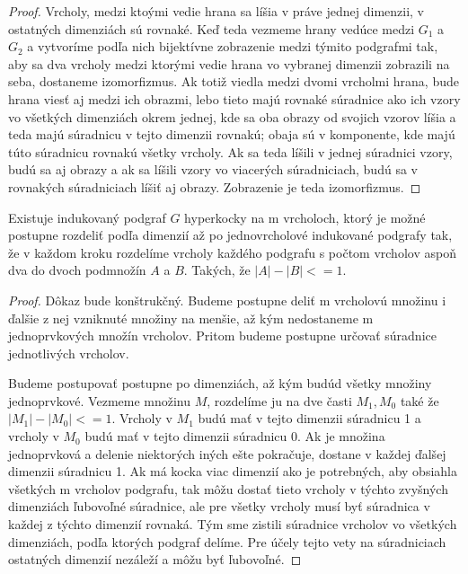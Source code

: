 \begin{proof}
Vrcholy, medzi ktoými vedie hrana sa líšia v práve jednej dimenzii, v
ostatných dimenziách sú rovnaké. Keď teda vezmeme hrany vedúce medzi 
$G_{1}$ a $G_{2}$ a vytvoríme podľa nich bijektívne zobrazenie medzi týmito
podgrafmi tak, aby sa dva vrcholy medzi ktorými vedie hrana vo vybranej
dimenzii zobrazili na seba, dostaneme izomorfizmus. Ak totiž viedla medzi
dvomi vrcholmi hrana, bude hrana viesť aj medzi ich obrazmi, lebo tieto majú
rovnaké súradnice ako ich vzory vo všetkých dimenziách okrem jednej, kde sa
oba obrazy od svojich vzorov líšia a teda majú súradnicu v tejto dimenzii 
rovnakú; obaja sú v komponente, kde majú túto súradnicu rovnakú všetky
vrcholy. Ak sa teda líšili v jednej súradnici vzory, budú sa aj obrazy a ak
sa líšili vzory vo viacerých súradniciach, budú sa v rovnakých súradniciach
líšiť aj obrazy. Zobrazenie  je teda izomorfizmus.
\end{proof}

\begin{lem}
\label{delenie}
Existuje indukovaný podgraf $G$ hyperkocky na m vrcholoch, ktorý je možné postupne rozdeliť
podľa dimenzií až po jednovrcholové indukované podgrafy tak, že v každom
kroku rozdelíme vrcholy každého podgrafu s počtom vrcholov aspoň dva do
dvoch podmnožín $A$ a $B$. Takých, že $|A| - |B| <= 1$.
\end{lem}

\begin{proof}
Dôkaz bude konštrukčný. Budeme postupne deliť m vrcholovú množinu i ďalšie z
nej vzniknuté množiny na menšie, až kým nedostaneme m jednoprvkových množín
vrcholov. Pritom budeme postupne určovať súradnice jednotlivých vrcholov.

Budeme postupovať postupne po dimenziách, až kým budúd všetky množiny
jednoprvkové. Vezmeme množinu $M$, rozdelíme ju na dve časti $M_{1}, M_{0}$
také že $|M_{1}| - |M_{0}| <= 1$. Vrcholy v $M_{1}$ budú mať v tejto
dimenzii súradnicu 1 a vrcholy v $M_{0}$ budú mať v tejto dimenzii súradnicu
0. Ak je množina jednoprvková a delenie niektorých iných ešte pokračuje,
dostane v každej ďalšej dimenzii súradnicu 1. Ak má kocka viac dimenzií ako
je potrebných, aby obsiahla všetkých m vrcholov podgrafu, tak môžu dostať
tieto vrcholy v týchto zvyšných dimenziách ľubovoľné súradnice, ale pre
všetky vrcholy musí byť súradnica v každej z týchto dimenzií rovnaká.
Tým sme zistili súradnice vrcholov vo všetkých dimenziách, podľa ktorých
podgraf delíme. Pre účely tejto vety na súradniciach ostatných dimenzií
nezáleží a môžu byť ľubovoľné.
\end{proof}

